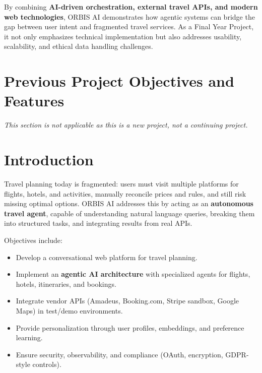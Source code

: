 \documentclass[12pt,a4paper]{article}
\begin{document}
By combining \textbf{AI-driven orchestration, external travel APIs, and modern web technologies}, ORBIS AI demonstrates how agentic systems can bridge the gap between user intent and fragmented travel services. As a Final Year Project, it not only emphasizes technical implementation but also addresses usability, scalability, and ethical data handling challenges.

\vspace{1cm}

\section*{Previous Project Objectives and Features }

\textit{This section is not applicable as this is a new project, not a continuing project.}

\vspace{1cm}

\section{Introduction }

Travel planning today is fragmented: users must visit multiple platforms for flights, hotels, and activities, manually reconcile prices and rules, and still risk missing optimal options. ORBIS AI addresses this by acting as an \textbf{autonomous travel agent}, capable of understanding natural language queries, breaking them into structured tasks, and integrating results from real APIs.

Objectives include:

\begin{itemize}
\item Develop a conversational web platform for travel planning.
\item Implement an \textbf{agentic AI architecture} with specialized agents for flights, hotels, itineraries, and bookings.
\item Integrate vendor APIs (Amadeus, Booking.com, Stripe sandbox, Google Maps) in test/demo environments.
\item Provide personalization through user profiles, embeddings, and preference learning.
\item Ensure security, observability, and compliance (OAuth, encryption, GDPR-style controls).
\end{itemize}
\end{document}

